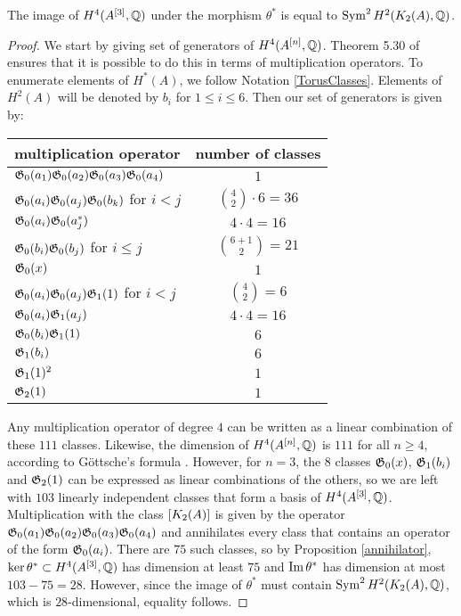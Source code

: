 \begin{proposition}\label{ImSym}
The image of $H^4(A^{[3]},\mathbb{Q})$ under the morphism $\theta^*$ is equal to $\operatorname{Sym}^2H^2(K_{ 2 }( A ),\mathbb{Q})$.
\end{proposition}
\begin{proof}
We start by giving set of generators of $H^4(A^{[n]},\mathbb{Q})$. Theorem 5.30 of \cite{LiQinWang} ensures that it is possible to do this in terms of multiplication operators. To enumerate elements of $H^*(A)$, we follow Notation \ref{TorusClasses}. Elements of $H^2(A)$ will be denoted by $b_i$ for $1\leq i\leq 6$. Then our set of generators is given by:
\begin{center}
\begin{tabular}{l|c}
multiplication operator & number of classes \\ \hline
$\mathfrak{G}_0(a_1)\mathfrak{G}_0(a_2)\mathfrak{G}_0(a_3)\mathfrak{G}_0(a_4) $  & $1$ \\
$\mathfrak{G}_0(a_i)\mathfrak{G}_0(a_j)\mathfrak{G}_0(b_k)$ for $i<j$  & $\binom{4}{2}\cdot 6 = 36$ \\
$\mathfrak{G}_0(a_i)\mathfrak{G}_0(a_j^*)$ & $4\cdot 4 = 16$ \\
$\mathfrak{G}_0(b_i)\mathfrak{G}_0(b_j)$ for $i\leq j$& $\binom{6+1}{2}= 21$ \\
$\mathfrak{G}_0(x)$ &  $1$  \\ \hline
$\mathfrak{G}_0(a_i)\mathfrak{G}_0(a_j)\mathfrak{G}_1(1)$ for $i<j$ & $\binom{4}{2} = 6$ \\
$\mathfrak{G}_0(a_i)\mathfrak{G}_1(a_j)$ & $4\cdot 4=16$ \\
$\mathfrak{G}_0(b_i)\mathfrak{G}_1(1)$ & $6$ \\
$\mathfrak{G}_1(b_i)$ & $6$ \\
$\mathfrak{G}_1(1)^2 $ & $1$ \\ \hline
$\mathfrak{G}_2(1) $ &$1$
\end{tabular}
\end{center}
Any multiplication operator of degree $4$ can be written as a linear combination of these $111$ classes. Likewise, the dimension of $H^4(A^{[n]},\mathbb{Q})$ is $111$ for all $n\geq 4$, according to G\"ottsche's formula \cite{Gottsche}. However, for $n=3$, the $8$ classes $\mathfrak{G}_0(x)$, $\mathfrak{G}_1(b_i)$ and $\mathfrak{G}_2(1) $ can be expressed as linear combinations of the others, so we are left with $103$ linearly independent classes that form a basis of $H^4(A^{[3]},\mathbb{Q})$. Multiplication with the class $[K_{ 2 }( A )]$ is given by the operator $\mathfrak{G}_0(a_1)\mathfrak{G}_0(a_2)\mathfrak{G}_0(a_3)\mathfrak{G}_0(a_4) $ and annihilates every class that contains an operator of the form $\mathfrak{G}_0(a_i)$. There are $75$ such classes, so by Proposition \ref{annihilator}, $\ker \theta^*\subset H^4(A^{[3]},\mathbb{Q})$ has dimension at least $75$ and $\operatorname{Im}\theta^*$ has dimension at most $103-75=28$. However, since the image of $\theta^*$ must contain $\operatorname{Sym}^2H^2(K_{ 2 }( A ),\mathbb{Q})$, which is $28$-dimensional, equality follows.
\end{proof}


